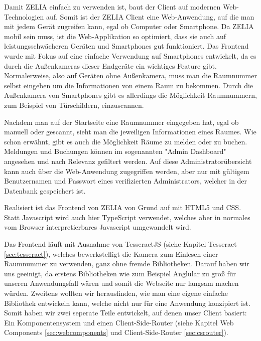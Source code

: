 
Damit ZELIA einfach zu verwenden ist, baut der Client auf modernen Web-Technologien auf. Somit ist der ZELIA Client eine Web-Anwendung, auf die man mit jedem Gerät zugreifen kann, egal ob Computer oder Smartphone. Da ZELIA mobil sein muss, ist die Web-Applikation so optimiert, dass sie auch auf leistungsschwächeren Geräten und Smartphones gut funktioniert. Das Frontend wurde mit Fokus auf eine einfache Verwendung auf Smartphones entwickelt, da es durch die Außenkameras dieser Endgeräte ein wichtiges Feature gibt. Normalerweise, also auf Geräten ohne Außenkamera, muss man die Raumnummer selbst eingeben um die Informationen von einem Raum zu bekommen. Durch die Außenkamera von Smartphones gibt es allerdings die Möglichkeit Raumnummern, zum Beispiel von Türschildern, einzuscannen. 

Nachdem man auf der Startseite eine Raumnummer eingegeben hat, egal ob manuell oder gescannt, sieht man die jeweiligen Informationen eines Raumes. Wie schon erwähnt, gibt es auch die Möglichkeit Räume zu melden oder zu buchen. Meldungen und Buchungen können im sogenannten "Admin Dashboard" angesehen und nach Relevanz gefiltert werden. Auf diese Administratorübersicht kann auch über die Web-Anwendung zugegriffen werden, aber nur mit gültigem Benutzernamen und Passwort eines verifizierten Administrators, welcher in der Datenbank gespeichert ist.

Realisiert ist das Frontend von ZELIA von Grund auf mit HTML5 und CSS. Statt Javascript wird auch hier TypeScript verwendet, welches aber in normales vom Browser interpretierbares Javascript umgewandelt wird. 

Das Frontend läuft mit Ausnahme von TesseractJS (siehe Kapitel Tesseract \ref{sec:tesseract}), welches bewerkstelligt die Kamera zum Einlesen einer Raumnummer zu verwenden, ganz ohne fremde Bibliotheken. Darauf haben wir uns geeinigt, da erstens Bibliotheken wie zum Beispiel Anglular zu groß für unseren Anwendungsfall wären und somit die Webseite nur langsam machen würden. Zweitens wollten wir herausfinden, wie man eine eigene einfache Bibliothek entwickeln kann, welche nicht nur für eine Anwendung konzipiert ist. Somit haben wir zwei seperate Teile entwickelt, auf denen unser Client basiert: Ein Komponentensystem und einen Client-Side-Router (siehe Kapitel Web Components \ref{sec:webcomponents} und Client-Side-Router \ref{sec:csrouter}).